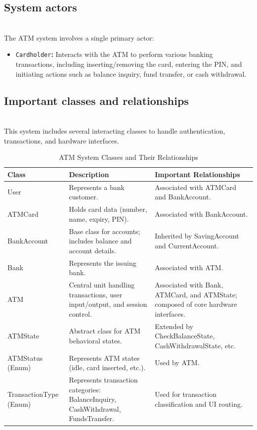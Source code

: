 \subsection{System actors}\label{PjjvyraiBWpSz24CcMI-B}
\\
The ATM system involves a single primary actor:

\begin{itemize}
\item
\protect{}\label{w0G8VAmhiZMjv2GW8MuCF}
\texttt{Cardholder}\textbf{:} Interacts with the ATM to perform various banking transactions, including inserting/removing the card, entering the PIN, and initiating actions such as balance inquiry, fund transfer, or cash withdrawal.
\end{itemize}

\subsection{Important classes and relationships}\label{_66iFhW1wlaXfoPZW_mwD}
\\
This system includes several interacting classes to handle authentication, transactions, and hardware interfaces.

\begin{table}[h!]
\centering
\begin{tabular}{|p{3cm}|p{6cm}|p{6cm}|}
\hline
\textbf{Class} & \textbf{Description} & \textbf{Important Relationships} \\
\hline
User & Represents a bank customer. & Associated with ATMCard and BankAccount. \\
\hline
ATMCard & Holds card data (number, name, expiry, PIN). & Associated with BankAccount. \\
\hline
BankAccount & Base class for accounts; includes balance and account details. & Inherited by SavingAccount and CurrentAccount. \\
\hline
Bank & Represents the issuing bank. & Associated with ATM. \\
\hline
ATM & Central unit handling transactions, user input/output, and session control. & Associated with Bank, ATMCard, and ATMState; composed of core hardware interfaces. \\
\hline
ATMState & Abstract class for ATM behavioral states. & Extended by CheckBalanceState, CashWithdrawalState, etc. \\
\hline
ATMStatus (Enum) & Represents ATM states (idle, card inserted, etc.). & Used by ATM. \\
\hline
TransactionType (Enum) & Represents transaction categories: BalanceInquiry, CashWithdrawal, FundsTransfer. & Used for transaction classification and UI routing. \\
\hline
\end{tabular}
\caption{ATM System Classes and Their Relationships}
\label{tab:atm_system_classes}
\end{table}


